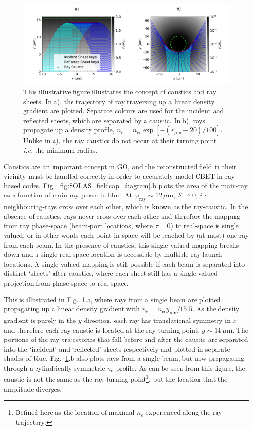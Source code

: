 \begin{figure}[t!]
    \includegraphics[width=\linewidth]{Numerics/Images/Raysheets_withcyl.png}
    \centering
    \caption{This illustrative figure illustrates the concept of caustics and ray sheets.
    In a), the trajectory of ray traversing up a linear density gradient are plotted.
    Separate colours are used for the incident and reflected sheets, which are separated by a caustic.
    In b), rays propagate up a density profile, $n_e=n_{\text{cr}}\exp{[ -(r_{\mu\text{m}}-20)/100 ]}$.
    Unlike in a), the ray caustics do not occur at their turning point, \textit{i.e.} the minimum radius.}%
    \label{fig:SOLAS_sheet_diagram}
\end{figure}

Caustics are an important concept in \ac{GO}, and the reconstructed field in their vicinity must be handled correctly in order to accurately model \ac{CBET} in ray based codes.
Fig.~\ref{fig:SOLAS_fieldcap_diagram}.b plots the area of the main-ray as a function of main-ray phase in blue.
At $\varphi_{\text{ray}}\sim12\ \mu\text{m}$, $S\rightarrow 0$, \textit{i.e.} neighbouring-rays cross over each other, which is known as the ray-caustic.
In the absence of caustics, rays never cross over each other and therefore the mapping from ray phase-space (beam-port locations, where $\tau=0$) to real-space is single valued, or in other words each point in space will be reached by (at most) one ray from each beam.
In the presence of caustics, this single valued mapping breaks down and a single real-space location is accessible by multiple ray launch locations.
A single valued mapping is still possible if each beam is separated into distinct `sheets' after caustics, where each sheet still has a single-valued projection from phase-space to real-space.

This is illustrated in Fig.~\ref{fig:SOLAS_sheet_diagram}.a, where rays from a single beam are plotted propagating up a linear density gradient with $n_e=n_{\text{cr}}y_{\mu\text{m}}/15.5$.
As the density gradient is purely in the $y$ direction, each ray has translational symmetry in $x$ and therefore each ray-caustic is located at the ray turning point, $y\sim14\ \mu\text{m}$.
The portions of the ray trajectories that fall before and after the caustic are separated into the `incident' and `reflected' sheets respectively and plotted in separate shades of blue.
Fig.~\ref{fig:SOLAS_sheet_diagram}.b also plots rays from a single beam, but now propagating through a cylindrically symmetric $n_e$ profile.
As can be seen from this figure, the caustic is not the same as the ray turning-point\footnote{Defined here as the location of maximal $n_e$ experienced along the ray trajectory.}, but the location that the amplitude diverges.

